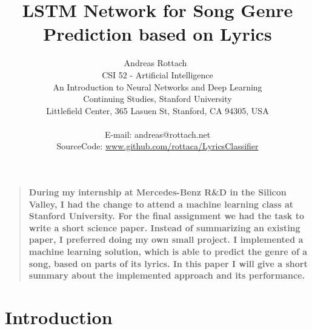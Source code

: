 \documentclass[12pt]{article}
\title{LSTM Network for Song Genre Prediction based on Lyrics}
\author
{Andreas Rottach\
\\
\normalsize{CSI 52 - Artificial Intelligence}\\
\normalsize{An Introduction to Neural Networks and Deep Learning}\\
\normalsize{Continuing Studies, Stanford University}\\
\normalsize{Littlefield Center, 365 Lasuen St, Stanford, CA 94305, USA}\\
\\
\normalsize{E-mail: andreas@rottach.net}\\
\normalsize{SourceCode: \url{www.github.com/rottaca/LyricsClassifier}}
}
\date{}
\newenvironment{sciabstract}{%
\begin{quote} \bf}
{\end{quote}}
\begin{document}
 


\baselineskip24pt


\maketitle 




\begin{sciabstract}
  During my internship at Mercedes-Benz R\&D in the Silicon Valley, I had the change to attend a machine learning class at Stanford University. For the final assignment we had the task to write a short science paper. Instead of summarizing an existing paper, I preferred doing my own small project. I implemented a machine learning solution, which is able to predict the genre of a song, based on parts of its lyrics. In this paper I will give a short summary about the implemented approach and its performance.
\end{sciabstract}




\section{Introduction}
\end{document}
